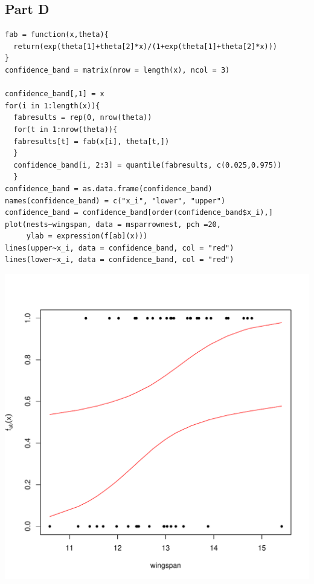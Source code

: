\documentclass{article}\usepackage[]{graphicx}\usepackage[]{color}
\makeatletter
\newenvironment{kframe}{%
 \def\at@end@of@kframe{}%
 \ifinner\ifhmode%
  \def\at@end@of@kframe{\end{minipage}}%
  \begin{minipage}{\columnwidth}%
 \fi\fi%
 \def\FrameCommand##1{\hskip\@totalleftmargin \hskip-\fboxsep
 \colorbox{shadecolor}{##1}\hskip-\fboxsep
     \hskip-\linewidth \hskip-\@totalleftmargin \hskip\columnwidth}%
 \MakeFramed {\advance\hsize-\width
   \@totalleftmargin\z@ \linewidth\hsize
   \@setminipage}}%
 {\par\unskip\endMakeFramed%
 \at@end@of@kframe}
\newenvironment{knitrout}{}{} %
\makeatother
\begin{document}
\subsection*{Part D}
\begin{knitrout}
\color{fgcolor}\begin{kframe}
\begin{verbatim}
fab = function(x,theta){
  return(exp(theta[1]+theta[2]*x)/(1+exp(theta[1]+theta[2]*x)))
}
confidence_band = matrix(nrow = length(x), ncol = 3)

confidence_band[,1] = x
for(i in 1:length(x)){
  fabresults = rep(0, nrow(theta))
  for(t in 1:nrow(theta)){
  fabresults[t] = fab(x[i], theta[t,])
  }
  confidence_band[i, 2:3] = quantile(fabresults, c(0.025,0.975))
  }
confidence_band = as.data.frame(confidence_band)
names(confidence_band) = c("x_i", "lower", "upper")
confidence_band = confidence_band[order(confidence_band$x_i),]
plot(nests~wingspan, data = msparrownest, pch =20, 
     ylab = expression(f[ab](x)))
lines(upper~x_i, data = confidence_band, col = "red")
lines(lower~x_i, data = confidence_band, col = "red")
\end{verbatim}
\end{kframe}
\includegraphics[width=1\linewidth]{figure/unnamed-chunk-13-1} 

\end{knitrout}
\end{document}
